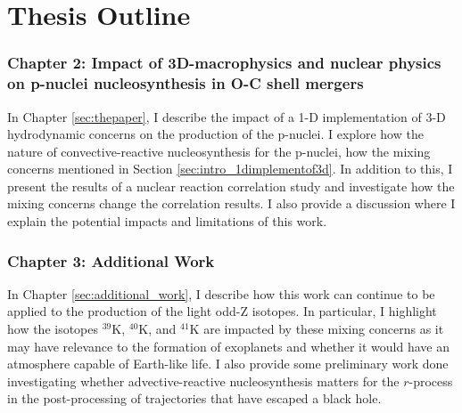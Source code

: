 \label{chapter:introduction}







\section{Thesis Outline}
\subsubsection{Chapter 2: Impact of 3D-macrophysics and nuclear physics on p-nuclei nucleosynthesis in O-C shell mergers}

In Chapter \ref{sec:thepaper}, I describe the impact of a 1-D implementation of 3-D hydrodynamic concerns on the production of the p-nuclei.
I explore how the nature of convective-reactive nucleosynthesis for the p-nuclei, how the mixing concerns mentioned in Section \ref{sec:intro_1dimplementof3d}.
In addition to this, I present the results of a nuclear reaction correlation study and investigate how the mixing concerns change the correlation results.
I also provide a discussion where I explain the potential impacts and limitations of this work.

\subsubsection{Chapter 3: Additional Work}
In Chapter \ref{sec:additional_work}, I describe how this work can continue to be applied to the production of the light odd-Z isotopes.
In particular, I highlight how the isotopes $^{39}\mathrm{K}$, $^{40}\mathrm{K}$, and $^{41}\mathrm{K}$ are impacted by these mixing concerns as it may have relevance to the formation of exoplanets and whether it would have an atmosphere capable of Earth-like life.
I also provide some preliminary work done investigating whether advective-reactive nucleosynthesis matters for the $r$-process in the post-processing of trajectories that have escaped a black hole.